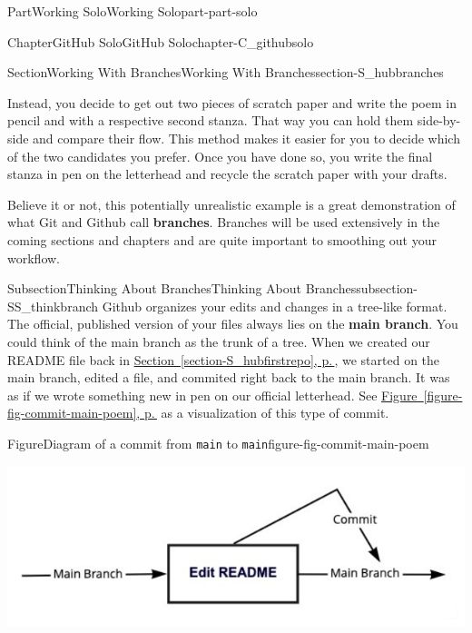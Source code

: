 \documentclass[twoside,10pt,]{book}
\newcommand{\xreffont}{\relax}
\newcommand{\mono}[1]{\texttt{#1}}
\newcommand{\terminology}[1]{\textbf{#1}}
\begin{document}
\begin{partptx}{Part}{Working Solo}{}{Working Solo}{}{}{part-part-solo}
\begin{chapterptx}{Chapter}{GitHub Solo}{}{GitHub Solo}{}{}{chapter-C_githubsolo}
\begin{sectionptx}{Section}{Working With Branches}{}{Working With Branches}{}{}{section-S_hubbranches}
\begin{introduction}{}
\par
Instead, you decide to get out two pieces of scratch paper and write the poem in pencil and with a respective second stanza. That way you can hold them side-by-side and compare their flow. This method makes it easier for you to decide which of the two candidates you prefer. Once you have done so, you write the final stanza in pen on the letterhead and recycle the scratch paper with your drafts.%
\par
Believe it or not, this potentially unrealistic example is a great demonstration of what Git and Github call \terminology{branches}. Branches will be used extensively in the coming sections and chapters and are quite important to smoothing out your workflow.%
\end{introduction}%
%
%
\typeout{************************************************}
\typeout{************************************************}
%
\begin{subsectionptx}{Subsection}{Thinking About Branches}{}{Thinking About Branches}{}{}{subsection-SS_thinkbranch}
%
%
Github organizes your edits and changes in a tree-like format. The official, published version of your files always lies on the \terminology{main branch}. You could think of the main branch as the trunk of a tree. When we created our README file back in \hyperref[section-S_hubfirstrepo]{Section~{\xreffont\ref{section-S_hubfirstrepo}}, p.\,\pageref{section-S_hubfirstrepo}}, we started on the main branch, edited a file, and commited right back to the main branch. It was as if we wrote something new in pen on our official letterhead. See \hyperref[figure-fig-commit-main-poem]{Figure~{\xreffont\ref{figure-fig-commit-main-poem}}, p.\,\pageref{figure-fig-commit-main-poem}} as a visualization of this type of commit.%
\begin{figureptx}{Figure}{Diagram of a commit from \mono{main} to \mono{main}}{figure-fig-commit-main-poem}{}%
\begin{image}{0.05}{0.9}{0.05}{}%
\includegraphics[width=\linewidth]{external/commit_main_poem.pdf}

\end{image}
\end{figureptx}
\end{subsectionptx}
\end{sectionptx}
\end{chapterptx}
\end{partptx}
\end{document}
